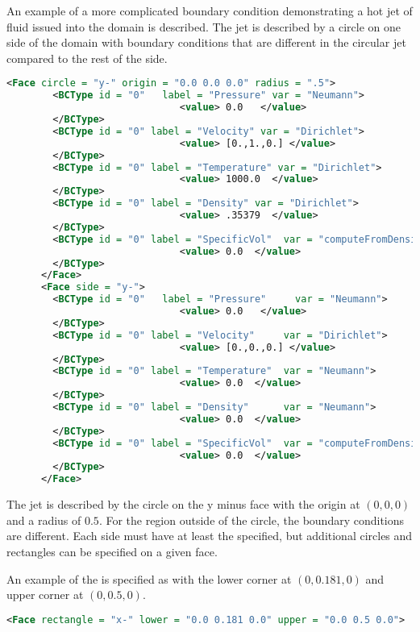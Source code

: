An example of a more complicated boundary condition demonstrating a
hot jet of fluid issued into the domain is described.  The jet is
described by a circle on one side of the domain with boundary
conditions that are different in the circular jet compared to the rest
of the side.
\begin{lstlisting}[language=XML]
 <Face circle = "y-" origin = "0.0 0.0 0.0" radius = ".5">
        <BCType id = "0"   label = "Pressure" var = "Neumann">
                              <value> 0.0   </value>
        </BCType>
        <BCType id = "0" label = "Velocity" var = "Dirichlet">
                              <value> [0.,1.,0.] </value>
        </BCType>
        <BCType id = "0" label = "Temperature" var = "Dirichlet">
                              <value> 1000.0  </value>
        </BCType>
        <BCType id = "0" label = "Density" var = "Dirichlet">
                              <value> .35379  </value>
        </BCType>
        <BCType id = "0" label = "SpecificVol"  var = "computeFromDensity">
                              <value> 0.0  </value>
        </BCType>
      </Face>
      <Face side = "y-">
        <BCType id = "0"   label = "Pressure"     var = "Neumann">
                              <value> 0.0   </value>
        </BCType>
        <BCType id = "0" label = "Velocity"     var = "Dirichlet">
                              <value> [0.,0.,0.] </value>
        </BCType>
        <BCType id = "0" label = "Temperature"  var = "Neumann">
                              <value> 0.0  </value>
        </BCType>
        <BCType id = "0" label = "Density"      var = "Neumann">
                              <value> 0.0  </value>
        </BCType>
        <BCType id = "0" label = "SpecificVol"  var = "computeFromDensity">
                              <value> 0.0  </value>
        </BCType>
      </Face>
\end{lstlisting}
The jet is described by the circle on the y minus face with the origin
at $(0,0,0)$ and a radius of $0.5$.  For the region outside of the circle,
the boundary conditions are different.  Each side must have at least
the  specified, but additional circles and
rectangles can be specified on a given face.

An example of the  is specified as with the
lower corner at $(0,0.181,0)$ and upper corner at $(0,0.5,0)$.
\begin{lstlisting}[language=XML]
 <Face rectangle = "x-" lower = "0.0 0.181 0.0" upper = "0.0 0.5 0.0">
\end{lstlisting}

